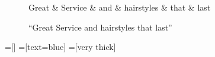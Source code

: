 \documentclass[11pt,a4paper]{article}
\begin{document}
\begin{figure}[h]
    \centering
    \begin{dependency}
    \begin{deptext}[column sep=0.1cm]
    Great \& Service \& and \& hairstyles \& that \& last  \\
    \end{deptext}
    \end{dependency}
    \caption{``Great Service and hairstyles that last''}
    \label{fig:aclrecl}
\end{figure}

    

=[] %
=[text=blue]%
=[very thick]
\end{document}
